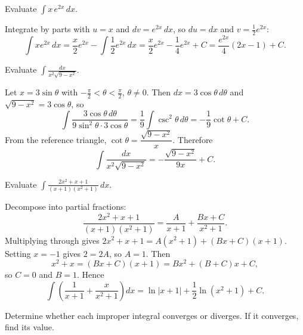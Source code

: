 \documentclass[11pt,addpoints]{exam}
\begin{document}
\begin{questions}

\question[10] Evaluate $\displaystyle \int x\,e^{2x}\,dx$.

\begin{solution}
Integrate by parts with $u = x$ and $dv = e^{2x}\,dx$, so $du = dx$ and $v = \tfrac{1}{2}e^{2x}$:
\[
  \int x e^{2x}\,dx = \frac{x}{2}e^{2x} - \int \frac{1}{2}e^{2x}\,dx = \frac{x}{2}e^{2x} - \frac{1}{4}e^{2x} + C = \frac{e^{2x}}{4}(2x - 1) + C.
\]
\end{solution}

\question[10] Evaluate $\displaystyle \int \frac{dx}{x^2\sqrt{9 - x^2}}$.

\begin{solution}
Let $x = 3\sin\theta$ with $-\frac{\pi}{2} < \theta < \frac{\pi}{2}$, $\theta \neq 0$. Then $dx = 3\cos\theta\,d\theta$ and $\sqrt{9 - x^2} = 3\cos\theta$, so
\[
  \int \frac{3\cos\theta\,d\theta}{9\sin^2\theta \cdot 3\cos\theta}
  = \frac{1}{9}\int \csc^2\theta\,d\theta
  = -\frac{1}{9}\cot\theta + C.
\]
From the reference triangle, $\cot\theta = \dfrac{\sqrt{9 - x^2}}{x}$. Therefore
\[
  \int \frac{dx}{x^2\sqrt{9 - x^2}} = -\frac{\sqrt{9 - x^2}}{9x} + C.
\]
\end{solution}

\question[12] Evaluate $\displaystyle \int \frac{2x^2 + x + 1}{(x + 1)(x^2 + 1)}\,dx$.

\begin{solution}
Decompose into partial fractions:
\[
  \frac{2x^2 + x + 1}{(x + 1)(x^2 + 1)} = \frac{A}{x + 1} + \frac{Bx + C}{x^2 + 1}.
\]
Multiplying through gives $2x^2 + x + 1 = A(x^2 + 1) + (Bx + C)(x + 1)$. Setting $x = -1$ gives $2 = 2A$, so $A = 1$. Then
\[
  x^2 + x = (Bx + C)(x + 1) = Bx^2 + (B + C)x + C,
\]
so $C = 0$ and $B = 1$. Hence
\[
  \int \left( \frac{1}{x + 1} + \frac{x}{x^2 + 1} \right) dx = \ln|x + 1| + \frac{1}{2}\ln(x^2 + 1) + C.
\]
\end{solution}

\question Determine whether each improper integral converges or diverges. If it converges, find its value.
\end{questions}
\end{document}
